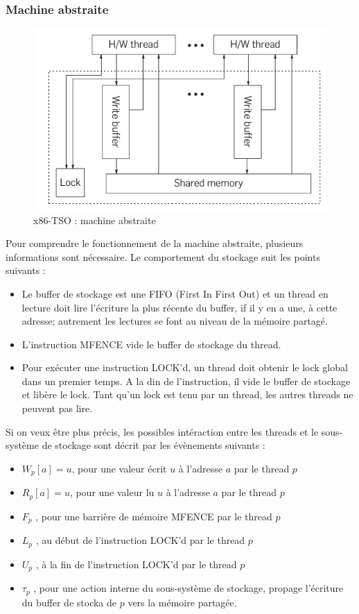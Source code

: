 \documentclass[12pt,a4paper]{article}
\begin{document}
\subsubsection*{Machine abstraite}

\begin{figure}[ht]
	\begin{center}
		\includegraphics[scale=0.8]{mach_abst.png}
		\caption{x86-TSO : machine abstraite}	
	\end{center}
\end{figure}

Pour comprendre le fonctionnement de la machine abstraite, plusieurs informations sont nécessaire. Le comportement du stockage suit les points suivants :
\begin{itemize}
	\item Le buffer de stockage est une FIFO (First In First Out) et un thread en lecture doit lire l'écriture la plus récente du buffer, if il y en a une, à cette adresse; autrement les lectures se font au niveau de la mémoire partagé.
	\item L'instruction MFENCE vide le buffer de stockage du thread.
	\item Pour exécuter une instruction LOCK'd, un thread doit obtenir le lock global dans un premier temps. A la din de l'instruction, il vide le buffer de stockage et libère le lock. Tant qu'un lock est tenu par un thread, les autres threads ne peuvent pas lire. 
\end{itemize}
Si on veux être plus précis, les possibles intéraction entre les threads et le sous-système de stockage sont décrit par les évènements suivants :

\begin{itemize}
	\item $W_p[a]=u$, pour une valeur écrit $u$ à l'adresse $a$ par le thread $p$	
	\item $R_p[a]=u$, pour une valeur lu $u$ à l'adresse $a$ par le thread $p$
	\item $F_p$ , pour une barrière de mémoire MFENCE par le thread $p$
	\item $L_p$ , au début de l'instruction LOCK'd par le thread $p$
	\item $U_p$ , à la fin de l'instruction LOCK'd par le thread $p$
	\item $\tau_p$ , pour une action interne du sous-système de stockage, propage l'écriture du buffer de stocka de $p$ vers la mémoire partagée.
\end{itemize}
\end{document}

